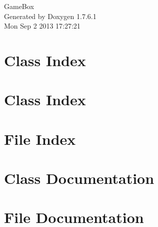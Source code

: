 \documentclass[a4paper]{book}
\begin{document}
\hypersetup{pageanchor=false,citecolor=blue}
\begin{titlepage}
\vspace*{7cm}
\begin{center}
{\Large \-Game\-Box }\\
\vspace*{1cm}
{\large \-Generated by Doxygen 1.7.6.1}\\
\vspace*{0.5cm}
{\small Mon Sep 2 2013 17:27:21}\\
\end{center}
\end{titlepage}
\clearemptydoublepage
{}
\tableofcontents
\clearemptydoublepage
{}
\hypersetup{pageanchor=true,citecolor=blue}
\chapter{\-Class \-Index}

\chapter{\-Class \-Index}

\chapter{\-File \-Index}

\chapter{\-Class \-Documentation}


















\chapter{\-File \-Documentation}





















\printindex
\end{document}

